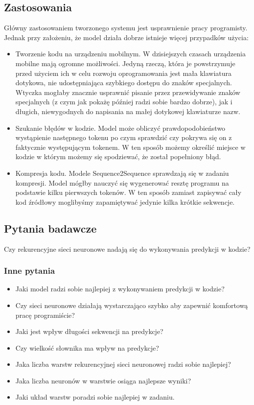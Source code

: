 \subsection {Zastosowania}
Główny zastosowaniem tworzonego systemu jest usprawnienie pracy programisty. Jednak przy założeniu, że model działa dobrze 
istnieje więcej przypadków użycia: 
\begin{itemize}
	\item Tworzenie kodu na urządzeniu mobilnym. W dzisiejszych czasach urządzenia mobilne mają ogromne możliwości. 
	Jedyną rzeczą, która je powstrzymuje przed użyciem ich w celu rozwoju oprogramowania jest mała klawiatura dotykowa, nie
	udostępniająca szybkiego dostępu do znaków specjalnych. Wtyczka mogłaby znacznie usprawnić pisanie przez przewidywanie znaków 
	specjalnych (z czym jak pokażę później radzi sobie bardzo dobrze), jak i długich, niewygodnych do napisania na małej dotykowej klawiaturze nazw.

	\item Szukanie błędów w kodzie. Model może obliczyć prawdopodobieństwo wystąpienie następnego tokenu po czym sprawdzić czy 
	pokrywa się on z faktycznie występującym tokenem. W ten sposób możemy określić miejsce w kodzie w którym możemy się 
	spodziewać, że został popełniony błąd. 

	\item Kompresja kodu. Modele Sequence2Sequence sprawdzają się w zadaniu kompresji. Model mógłby nauczyć się wygenerować resztę programu 
	na podstawie kilku pierwszych tokenów. W ten sposób zamiast zapisywać cały kod źródłowy moglibyśmy zapamiętywać jedynie kilka 
	krótkie sekwencje. 
\end{itemize}

\subsection {Pytania badawcze}
Czy rekurencyjne sieci neuronowe nadają się do wykonywania predykcji w kodzie?
\subsubsection {Inne pytania}
\label{questions}
\begin{itemize}
	\item Jaki model radzi sobie najlepiej z wykonywaniem predykcji w kodzie? 
	\item Czy sieci neuronowe działają wystarczająco szybko aby zapewnić komfortową pracę programiście? 
	\item Jaki jest wpływ długości sekwencji na predykcje? 
	\item Czy wielkość słownika ma wpływ na predykcje? 
	\item Jaka liczba warstw rekurencyjnej sieci neuronowej radzi sobie najlepiej? 
	\item Jaka liczba neuronów w warstwie osiąga najlepsze wyniki? 
	\item Jaki układ warstw poradzi sobie najlepiej w zadaniu. 
\end{itemize} 


